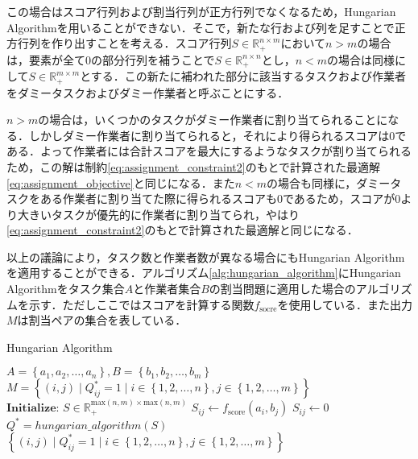         この場合はスコア行列および割当行列が正方行列でなくなるため，Hungarian Algorithmを用いることができない．そこで，新たな行および列を足すことで正方行列を作り出すことを考える．スコア行列$S \in \mathbb{R}_+^{n \times m}$において$n > m$の場合は，要素が全て$0$の部分行列を補うことで$S \in \mathbb{R}_+^{n \times n}$とし，$n < m$の場合は同様にして$S \in \mathbb{R}_+^{m \times m}$とする．この新たに補われた部分に該当するタスクおよび作業者をダミータスクおよびダミー作業者と呼ぶことにする．

        $n > m$の場合は，いくつかのタスクがダミー作業者に割り当てられることになる．しかしダミー作業者に割り当てられると，それにより得られるスコアは$0$である．よって作業者には合計スコアを最大にするようなタスクが割り当てられるため，この解は制約\ref{eq:assignment_constraint2}のもとで計算された最適解\ref{eq:assignment_objective}と同じになる．また$n < m$の場合も同様に，ダミータスクをある作業者に割り当てた際に得られるスコアも$0$であるため，スコアが$0$より大きいタスクが優先的に作業者に割り当てられ，やはり\ref{eq:assignment_constraint2}のもとで計算された最適解と同じになる．
        
        以上の議論により，タスク数と作業者数が異なる場合にもHungarian Algorithmを適用することができる．アルゴリズム\ref{alg:hungarian_algorithm}にHungarian Algorithmをタスク集合$A$と作業者集合$B$の割当問題に適用した場合のアルゴリズムを示す．ただしここではスコアを計算する関数$f_{\text{socre}}$を使用している．また出力$M$は割当ペアの集合を表している．

        \begin{algorithm}[t]
            \caption{Hungarian Algorithm}
            \label{alg:hungarian_algorithm}
            \begin{algorithmic}[1]
                \REQUIRE $A = \left\{a_1, a_2, \dots, a_n\right\}, B = \left\{b_1, b_2, \dots, b_m\right\}$
                \ENSURE $M = \left\{(i, j) \mid Q^*_{ij} = 1 \mid i \in \left\{1, 2, \dots, n\right\}, j \in \left\{1, 2, \dots, m\right\}\right\}$
                \STATE $\textbf{Initialize: } S \in \mathbb{R}_+^{\text{max}(n, m) \times \text{max}(n, m)}$
                            \STATE $S_{ij} \leftarrow f_{\text{score}}(a_i, b_j)$
                        \ELSE 
                            \STATE $S_{ij} \leftarrow 0$
                        \ENDIF
                    \ENDFOR
                \ENDFOR
                \STATE $Q^* = hungarian\_algorithm(S)$
                \RETURN $\left\{(i, j) \mid Q^*_{ij} = 1 \mid i \in \left\{1, 2, \dots, n\right\}, j \in \left\{1, 2, \dots, m\right\}\right\}$
            \end{algorithmic}
        \end{algorithm}

